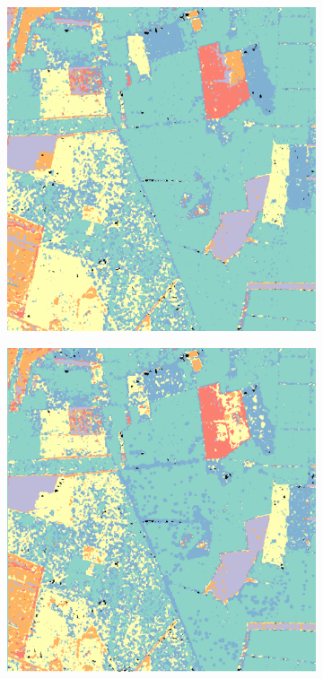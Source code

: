 \begin{figure}[tp]
\begin{subfigure}[b]{0.35\textwidth}
		\caption{}
		\label{fig:C}
	\end{subfigure}
	\begin{subfigure}[b]{0.35\textwidth}
		\includegraphics[width=\textwidth]{Figures/Kron/Review/C+L_RAW+COLOUR_CROP_MASK}
		\caption{}
		\label{fig:L}
	\end{subfigure}
	\begin{subfigure}[b]{0.35\textwidth}
		\includegraphics[width=\textwidth]{Figures/Kron/Review/L_COLOUR_PR_CROP_MASK}

\end{subfigure}
\end{figure}
